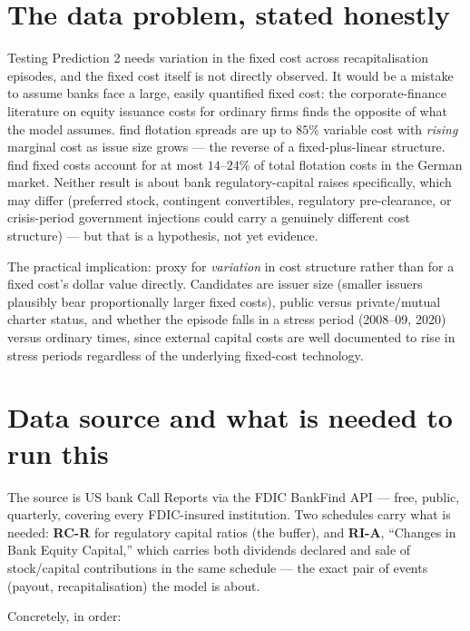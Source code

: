 \documentclass[11pt]{article}
\begin{document}
\section{The data problem, stated honestly}

Testing Prediction 2 needs variation in the fixed cost across
recapitalisation episodes, and the fixed cost itself is not directly
observed. It would be a mistake to assume banks face a large, easily
quantified fixed cost: the corporate-finance literature on equity issuance
costs for ordinary firms finds the opposite of what the model assumes.
\citet{altinkilic2000} find flotation spreads are up to $85\%$ variable
cost with \emph{rising} marginal cost as issue size grows --- the reverse
of a fixed-plus-linear structure. \citet{buhner2002} find fixed costs
account for at most $14$--$24\%$ of total flotation costs in the German
market. Neither result is about bank regulatory-capital raises
specifically, which may differ (preferred stock, contingent convertibles,
regulatory pre-clearance, or crisis-period government injections could
carry a genuinely different cost structure) --- but that is a hypothesis,
not yet evidence.

The practical implication: proxy for \emph{variation} in cost structure
rather than for a fixed cost's dollar value directly. Candidates are
issuer size (smaller issuers plausibly bear proportionally larger fixed
costs), public versus private/mutual charter status, and whether the
episode falls in a stress period (2008--09, 2020) versus ordinary times,
since external capital costs are well documented to rise in stress
periods regardless of the underlying fixed-cost technology.

\section{Data source and what is needed to run this}

The source is US bank Call Reports via the FDIC BankFind API --- free,
public, quarterly, covering every FDIC-insured institution. Two schedules
carry what is needed: \textbf{RC-R} for regulatory capital ratios (the
buffer), and \textbf{RI-A}, ``Changes in Bank Equity Capital,'' which
carries both dividends declared and sale of stock/capital contributions
in the same schedule --- the exact pair of events (payout,
recapitalisation) the model is about.

Concretely, in order:
\end{document}
